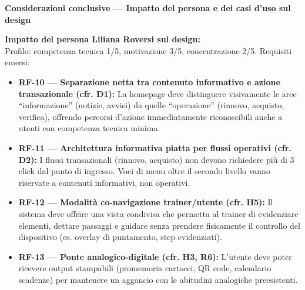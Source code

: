 ﻿\documentclass[11pt,a4paper]{article}
\begin{document}
\newpage

% 


\begin{tcolorbox}[sectionbox,colback=primaryColor!10]
    \textbf{Considerazioni conclusive --- Impatto del persona e dei casi d'uso sul design}
\end{tcolorbox}

\vspace{0.3cm}

\begin{tcolorbox}[base]
    {\small
    \textbf{Impatto del persona Liliana Roversi sul design:} \\[4pt]
    Profilo: competenza tecnica 1/5, motivazione 3/5, concentrazione 2/5. Requisiti emersi:

    \begin{itemize}[leftmargin=*]
        \item \textbf{RF-10 --- Separazione netta tra contenuto informativo e azione transazionale (cfr. D1):} La homepage deve distinguere visivamente le aree ``informazione'' (notizie, avvisi) da quelle ``operazione'' (rinnovo, acquisto, verifica), offrendo percorsi d'azione immediatamente riconoscibili anche a utenti con competenza tecnica minima.

        \item \textbf{RF-11 --- Architettura informativa piatta per flussi operativi (cfr. D2):} I flussi transazionali (rinnovo, acquisto) non devono richiedere più di 3 click dal punto di ingresso. Voci di menu oltre il secondo livello vanno riservate a contenuti informativi, non operativi.

        \item \textbf{RF-12 --- Modalità co-navigazione trainer/utente (cfr. H5):} Il sistema deve offrire una vista condivisa che permetta al trainer di evidenziare elementi, dettare passaggi e guidare senza prendere fisicamente il controllo del dispositivo (es. overlay di puntamento, step evidenziati).

        \item \textbf{RF-13 --- Ponte analogico-digitale (cfr. H3, R6):} L'utente deve poter ricevere output stampabili (promemoria cartacei, QR code, calendario scadenze) per mantenere un aggancio con le abitudini analogiche preesistenti.
    \end{itemize}
    }
\end{tcolorbox}
\end{document}
